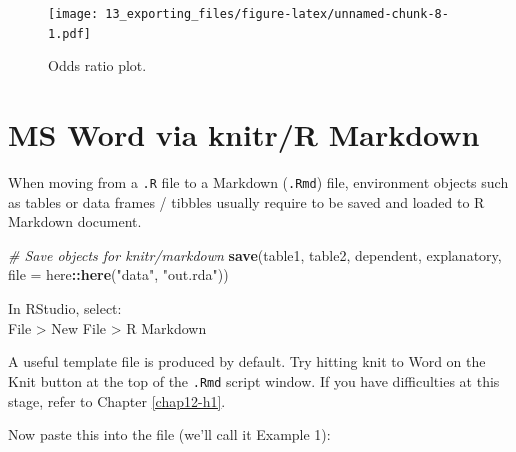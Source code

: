 \documentclass[
  12pt,
  krantz2]{krantz}
\makeatletter
\newenvironment{Shaded}{\begin{snugshade}}{\end{snugshade}}
\newcommand{\CommentTok}[1]{\textcolor[rgb]{0.56,0.35,0.01}{\textit{#1}}}
\newcommand{\DataTypeTok}[1]{\textcolor[rgb]{0.13,0.29,0.53}{#1}}
\newcommand{\DecValTok}[1]{\textcolor[rgb]{0.00,0.00,0.81}{#1}}
\newcommand{\FloatTok}[1]{\textcolor[rgb]{0.00,0.00,0.81}{#1}}
\newcommand{\KeywordTok}[1]{\textcolor[rgb]{0.13,0.29,0.53}{\textbf{#1}}}
\newcommand{\NormalTok}[1]{#1}
\newcommand{\OperatorTok}[1]{\textcolor[rgb]{0.81,0.36,0.00}{\textbf{#1}}}
\newcommand{\StringTok}[1]{\textcolor[rgb]{0.31,0.60,0.02}{#1}}
\newenvironment{kframe}{%
\medskip{}
\setlength{\fboxsep}{.8em}
 \def\at@end@of@kframe{}%
 \ifinner\ifhmode%
  \def\at@end@of@kframe{\end{minipage}}%
  \begin{minipage}{\columnwidth}%
 \fi\fi%
 \def\FrameCommand##1{\hskip\@totalleftmargin \hskip-\fboxsep
 \colorbox{shadecolor}{##1}\hskip-\fboxsep
     \hskip-\linewidth \hskip-\@totalleftmargin \hskip\columnwidth}%
 \MakeFramed {\advance\hsize-\width
   \@totalleftmargin\z@ \linewidth\hsize
   \@setminipage}}%
 {\par\unskip\endMakeFramed%
 \at@end@of@kframe}
\renewenvironment{Shaded}{\begin{kframe}}{\end{kframe}}
\makeatother
\begin{document}
\begin{Shaded}
\end{Shaded}

\begin{figure}
\centering
\texttt{[image: 13\_exporting\_files/figure-latex/unnamed-chunk-8-1.pdf]}
\caption{\label{fig:unnamed-chunk-8}Odds ratio plot.}
\end{figure}

\hypertarget{ms-word-via-knitrr-markdown}{%
\section{MS Word via knitr/R Markdown}\label{ms-word-via-knitrr-markdown}}


When moving from a \texttt{.R} file to a Markdown (\texttt{.Rmd}) file, environment objects such as tables or data frames / tibbles usually require to be saved and loaded to R Markdown document.

\begin{Shaded}
\begin{Highlighting}[]
\CommentTok{# Save objects for knitr/markdown}
\KeywordTok{save}\NormalTok{(table1, table2, dependent, explanatory, }
     \DataTypeTok{file =}\NormalTok{ here}\OperatorTok{::}\KeywordTok{here}\NormalTok{(}\StringTok{"data"}\NormalTok{, }\StringTok{"out.rda"}\NormalTok{))}
\end{Highlighting}
\end{Shaded}

In RStudio, select:\\
File \textgreater{} New File \textgreater{} R Markdown

A useful template file is produced by default. Try hitting knit to Word on the Knit button at the top of the \texttt{.Rmd} script window.
If you have difficulties at this stage, refer to Chapter \ref{chap12-h1}.

Now paste this into the file (we'll call it Example 1):
\end{document}
